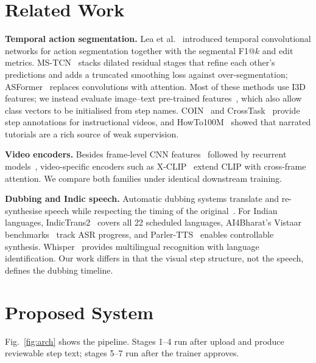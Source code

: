 \documentclass[conference]{IEEEtran}
\begin{document}
\section{Related Work}
\textbf{Temporal action segmentation.} Lea et al.~\cite{lea2017tcn} introduced temporal convolutional networks for
action segmentation together with the segmental F1@$k$ and edit metrics. MS-TCN~\cite{farha2019mstcn} stacks
dilated residual stages that refine each other's predictions and adds a truncated smoothing loss against
over-segmentation; ASFormer~\cite{yi2021asformer} replaces convolutions with attention. Most of these methods use I3D
features; we instead evaluate image--text pre-trained features~\cite{radford2021clip}, which also allow class vectors to
be initialised from step names. COIN~\cite{tang2019coin} and CrossTask~\cite{zhukov2019crosstask} provide step
annotations for instructional videos, and HowTo100M~\cite{miech2019howto100m} showed that narrated tutorials are a rich
source of weak supervision.

\textbf{Video encoders.} Besides frame-level CNN features~\cite{he2016resnet} followed by recurrent models~\cite{hochreiter1997lstm},
video-specific encoders such as X-CLIP~\cite{ni2022xclip} extend CLIP with cross-frame attention. We compare both
families under identical downstream training.

\textbf{Dubbing and Indic speech.} Automatic dubbing systems translate and re-synthesise speech while respecting the
timing of the original~\cite{federico2020dubbing,oktem2019prosodic}. For Indian languages, IndicTrans2~\cite{gala2023indictrans2}
covers all 22 scheduled languages, AI4Bharat's Vistaar benchmarks~\cite{bhogale2023vistaar} track ASR progress, and
Parler-TTS~\cite{lyth2024parler} enables controllable synthesis. Whisper~\cite{radford2023whisper} provides multilingual
recognition with language identification. Our work differs in that the visual step structure, not the speech, defines
the dubbing timeline.

\section{Proposed System}
Fig.~\ref{fig:arch} shows the pipeline. Stages 1--4 run after upload and produce reviewable step text; stages 5--7 run
after the trainer approves.
\end{document}
